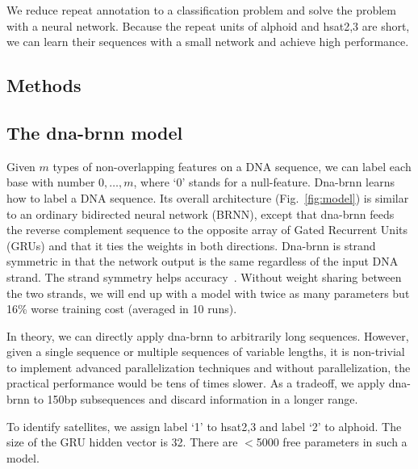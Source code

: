 \documentclass{bioinfo}
\begin{document}
We reduce repeat annotation to a classification problem and solve the problem
with a neural network. Because the repeat units of alphoid and hsat2,3 are
short, we can learn their sequences with a small network and achieve high
performance.

\begin{methods}
\section{Methods}

\subsection{The dna-brnn model}

Given $m$ types of non-overlapping features on a DNA sequence, we can label
each base with number $0,\ldots,m$, where `0' stands for a null-feature.
\mbox{Dna-brnn} learns how to label a DNA sequence. Its overall architecture
(Fig.~\ref{fig:model}) is similar to an ordinary bidirected neural network
(BRNN), except that \mbox{dna-brnn} feeds the reverse complement sequence to the
opposite array of Gated Recurrent Units (GRUs) and that it ties the weights in both directions. Dna-brnn is
strand symmetric in that the network output is the same regardless of the input
DNA strand. The strand symmetry helps accuracy~\citep{Shrikumar103663}.
Without weight sharing between the two strands, we will end up with a model
with twice as many parameters but 16\% worse training cost (averaged in 10
runs).

In theory, we can directly apply dna-brnn to arbitrarily long sequences.
However, given a single sequence or multiple sequences of variable lengths, it
is non-trivial to implement advanced parallelization techniques and without
parallelization, the practical performance would be tens of times slower. As a
tradeoff, we apply dna-brnn to 150bp subsequences and discard information in a
longer range.

To identify satellites, we assign label `1' to hsat2,3 and label `2' to
alphoid. The size of the GRU hidden vector is 32. There are $<$5000 free
parameters in such a model.


\end{methods}
\end{document}
